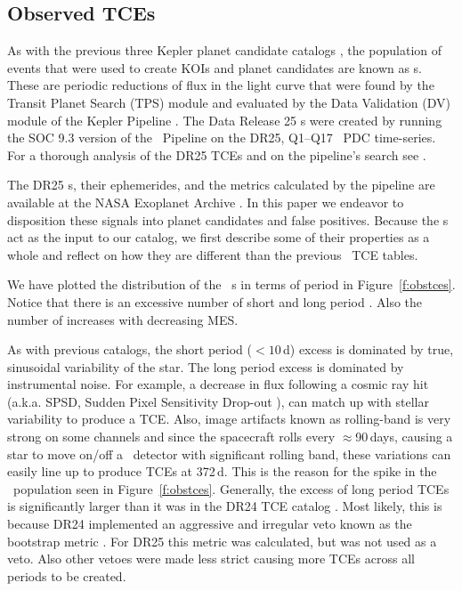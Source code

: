 \subsection{Observed TCEs}

\label{s:tces}
As with the previous three Kepler planet candidate catalogs \citep{Coughlin2016,Mullally2015cat,Rowe2015cat}, the population of events that were used to create KOIs and planet candidates are known as \opstce s. These are periodic reductions of flux in the light curve that were found by the Transit Planet Search (TPS) module and evaluated by the Data Validation (DV) module of the Kepler Pipeline \citep{JenkinsKDPH}.   The Data Release 25 \opstce s were created by running the SOC 9.3 version of the \Kepler\ Pipeline on the DR25, Q1--Q17 \Kepler\ PDC time-series.  For a thorough analysis of the DR25 TCEs and on the pipeline's search see \citet{Twicken2016}. 

The DR25 \opstce s, their ephemerides, and the metrics calculated by the pipeline are available at the NASA Exoplanet Archive \citep{Akeson2013}.  In this paper we endeavor to disposition these signals into planet candidates and false positives.  Because the \opstce s act as the input to our catalog, we first describe some of their properties as a whole and reflect on how they are different than the previous \Kepler\ TCE tables.

We have plotted the distribution of the \ntcesnorogue\ \opstce s in terms of period in Figure~\ref{f:obstces}. Notice that there is an excessive number of short and long period . Also the number of  increases with decreasing MES. 

As with previous catalogs, the short period ($<10$\,d) excess is dominated by true, sinusoidal variability of the star. The long period excess is dominated by instrumental noise. For example, a decrease in flux following a cosmic ray hit (a.k.a. SPSD, Sudden Pixel Sensitivity Drop-out \citep{KDCH}), can match up with stellar variability to produce a TCE. Also, image artifacts known as rolling-band is very strong on some channels \citep[see \S6.7 of][]{KIH}  and since the spacecraft rolls every $\approx$90\,days, causing a star to move on/off a \Kepler\ detector with significant rolling band, these variations can easily line up to produce TCEs at 372\,d. This is the reason for the spike in the \opstce\ population seen in Figure~\ref{f:obstces}. Generally, the excess of long period TCEs is significantly larger than it was in the DR24 TCE catalog \citep{Seader2015}. Most likely, this is because DR24 implemented an aggressive and irregular veto known as the bootstrap metric \citep{Seader2015}.  For DR25 this metric was calculated, but was not used as a veto. Also other vetoes were made less strict causing more TCEs across all periods to be created. 

